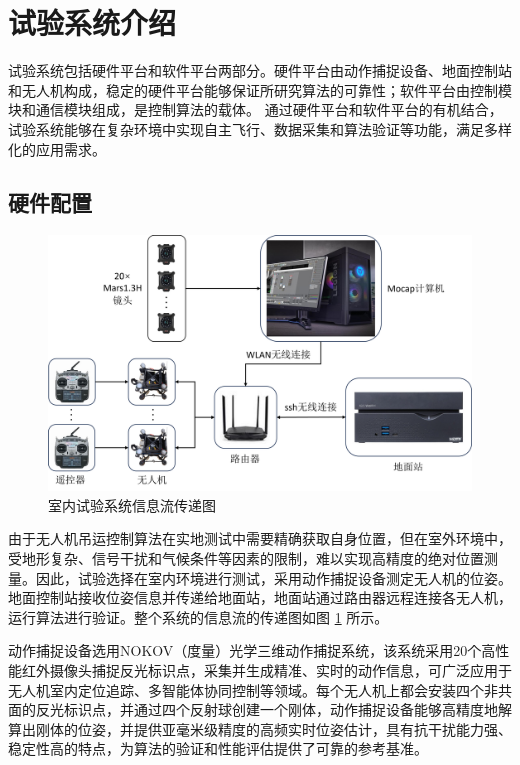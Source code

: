 \documentclass[lang=chs, degree=master, blindreview=false, winfonts=true]{yanputhesis}
\begin{document}
\section{试验系统介绍}   

试验系统包括硬件平台和软件平台两部分。硬件平台由动作捕捉设备、地面控制站和无人机构成，稳定的硬件平台能够保证所研究算法的可靠性；软件平台由控制模块和通信模块组成，是控制算法的载体。
通过硬件平台和软件平台的有机结合，试验系统能够在复杂环境中实现自主飞行、数据采集和算法验证等功能，满足多样化的应用需求。

\subsection{硬件配置}
\begin{figure}[hbt!]
	\centering
	\includegraphics[width=36pc]{picture/5_4.png} 
	\caption{室内试验系统信息流传递图} 
	\label{framework}
\end{figure}
由于无人机吊运控制算法在实地测试中需要精确获取自身位置，但在室外环境中，受地形复杂、信号干扰和气候条件等因素的限制，难以实现高精度的绝对位置测量。因此，试验选择在室内环境进行测试，采用动作捕捉设备测定无人机的位姿。地面控制站接收位姿信息并传递给地面站，地面站通过路由器远程连接各无人机，运行算法进行验证。整个系统的信息流的传递图如图 \ref{framework} 所示。


动作捕捉设备选用NOKOV（度量）光学三维动作捕捉系统，该系统采用20个高性能红外摄像头捕捉反光标识点，采集并生成精准、实时的动作信息，可广泛应用于无人机室内定位追踪、多智能体协同控制等领域。每个无人机上都会安装四个非共面的反光标识点，并通过四个反射球创建一个刚体，动作捕捉设备能够高精度地解算出刚体的位姿，并提供亚毫米级精度的高频实时位姿估计，具有抗干扰能力强、稳定性高的特点，为算法的验证和性能评估提供了可靠的参考基准。
\end{document}

